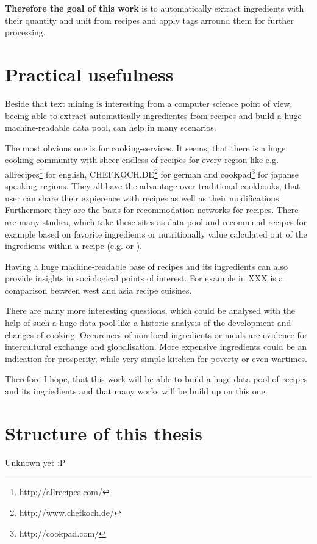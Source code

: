 \documentclass[12pt, twoside]{report}
\begin{document}
\textbf{Therefore the goal of this work} is to automatically extract ingredients with their quantity and unit from recipes and apply tags arround them for further processing.


\section{Practical usefulness}
Beside that text mining is interesting from a computer science point of view, beeing able to extract automatically ingredientes from recipes and build a huge machine-readable data pool, can help in many scenarios.

The most obvious one is for cooking-services. It seems, that there is a huge cooking community with sheer endless of recipes for every region like e.g. allrecipes\footnote{http://allrecipes.com/} for english, CHEFKOCH.DE\footnote{http://www.chefkoch.de/} for german and cookpad\footnote{http://cookpad.com/} for japanse speaking regions. They all have the advantage over traditional cookbooks, that user can share their expierence with recipes as well as their modifications. Furthermore they are the basis for recommodation networks for recipes. There are many studies, which take these sites as data pool and recommend recipes for example based on favorite ingredients or nutritionally value calculated out of the ingredients within a recipe (e.g. \cite{ingredientNetworks} or \cite{recipeRecommendation}).

Having a huge machine-readable base of recipes and its ingredients can also provide insights in sociological points of interest. For example in XXX is a comparison between west and asia recipe cuisines.

There are many more interesting questions, which could be analysed with the help of such a huge data pool like a historic analysis of the development and changes of cooking. Occurences of non-local ingredients or meals are evidence for intercultural exchange and globalisation. More expensive ingredients could be an indication for prosperity, while very simple kitchen for poverty or even wartimes.

Therefore I hope, that this work will be able to build a huge data pool of recipes and its ingriedients and that many works will be build up on this one.

\section{Structure of this thesis}
Unknown yet :P
\end{document}
